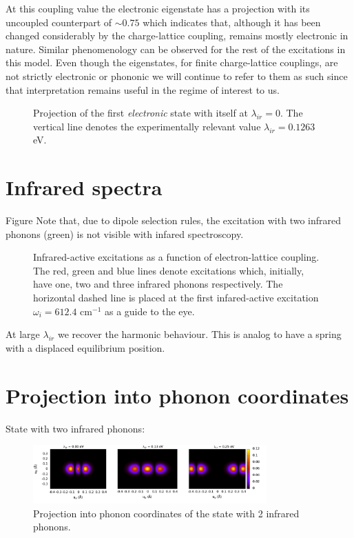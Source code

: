 At this coupling value the electronic eigenstate has a projection with its uncoupled counterpart of $\sim 0.75$ which indicates that, although it has been changed considerably by the charge-lattice coupling, remains mostly electronic in nature.
Similar phenomenology can be observed for the rest of the excitations in this model.
Even though the eigenstates, for finite charge-lattice couplings, are not strictly electronic or phononic we will continue to refer to them as such since that interpretation remains useful in the regime of interest to us.
%
\begin{figure}
  \centering
  
  \caption[Projection of the first \textit{electronic} state with itself at $\lambda_{ir}=0$.]
  {Projection of the first \textit{electronic} state with itself at $\lambda_{ir}=0$.
    The vertical line denotes the experimentally relevant value $\lambda_{ir}=0.1263$ eV.}
  \label{fig:electr-proj}
\end{figure}

\section{Infrared spectra}

Figure
Note that, due to dipole selection rules, the excitation with two infrared phonons (green) is not visible with infared spectroscopy.

\begin{figure}
  \centering
  
  \caption[Infrared-active excitations as a function of electron-lattice coupling.]
  {Infrared-active excitations as a function of electron-lattice coupling.
  The red, green and blue lines denote excitations which, initially, have one, two and three infrared phonons respectively.
  The horizontal dashed line is placed at the first infared-active excitation $\omega_i=612.4$ cm$^{-1}$ as a guide to the eye.}
  \label{fig:spectra}
\end{figure}


At large $\lambda_{ir}$ we recover the harmonic behaviour. This is analog to have a spring with a displaced equilibrium position.

\section{Projection into phonon coordinates}

State with two infrared phonons:

\begin{figure}[ht!]
  \centering
  \includegraphics[width=0.8\textwidth]{images/ph-second_infrared.png}
  \caption{Projection into phonon coordinates of the state with 2 infrared phonons.}
  \label{fig:ph-second_infrared}
\end{figure}

